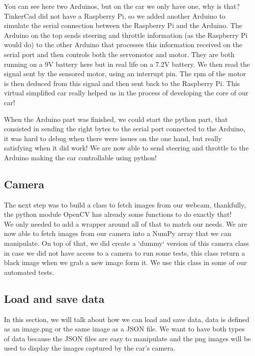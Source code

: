 \documentclass[12pt]{article}
\begin{document}
You can see here two Arduinos, but on the car we only have one, why is that? TinkerCad did not have a Raspberry Pi, so we added another Arduino to simulate the serial connection between the Raspberry Pi and the Arduino. The Arduino on the top sends steering and throttle information (as the Raspberry Pi would do) to the other Arduino that processes this information received on the serial port and then controls both the servomotor and motor. They are both running on a 9V battery here but in real life on a 7.2V battery. We then read the signal sent by the sensored motor, using an interrupt pin. The rpm of the motor is then deduced from this signal and then sent back to the Raspberry Pi.
This virtual simplified car really helped us in the process of developing the core of our car!

When the Arduino part was finished, we could start the python part, that consisted in sending the right bytes to the serial port connected to the Arduino, it was hard to debug when there were issues on the one hand, but really satisfying when it did work! We are now able to send steering and throttle to the Arduino making the car controllable using python!

\subsection{Camera}
The next step was to build a class to fetch images from our webcam, thankfully, the python module OpenCV has already some functions to do exactly that! \\
We only needed to add a wrapper around all of that to match our needs. We are now able to fetch images from our camera into a NumPy array that we can manipulate. On top of that, we did create a `dummy` version of this camera class in case we did not have access to a camera to run some tests, this class return a black image when we grab a new image form it. We use this class in some of our automated tests.

\subsection{Load and save data}
In this section, we will talk about how we can load and save data, data is defined as an image.png or the same image as a JSON file. We want to have both types of data because the JSON files are easy to manipulate and the png images will be used to display the images captured by the car's camera.\\
\end{document}
